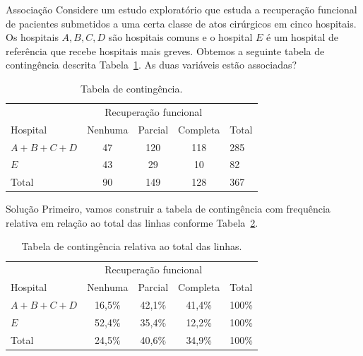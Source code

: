 \documentclass[9pt]{beamer}
\begin{document}
\begin{frame}{Associação}
Considere um estudo exploratório que estuda a recuperação funcional de pacientes submetidos a uma certa classe de atos cirúrgicos em cinco hospitais. Os hospitais $A, B, C, D$ são hospitais comuns e o hospital $E$ é um hospital de referência que recebe hospitais mais greves. Obtemos a seguinte tabela de contingência descrita Tabela~\ref{tab:independencia_conj}. As duas variáveis estão associadas?
\begin{table}[htbp]
	\centering
	\caption{Tabela de contingência.}
	\label{tab:independencia_conj}
	\begin{tabular}{l|ccc|l}
		\toprule[0.05cm]
		& \multicolumn{3}{|c|}{Recuperação funcional} & \\ \cmidrule[0.05cm]{2-4}
		Hospital & Nenhuma & Parcial & Completa & Total \\ \midrule[0.05cm]
		$A+B+C+D$ & 47 & 120 & 118 & 285\\
		$E$ & 43 & 29 & 10 & 82 \\ \midrule[0.05cm]
		Total & 90 & 149 & 128 & 367\\ \bottomrule[0.05cm]
	\end{tabular}
\end{table}
\end{frame}

\begin{frame}{Solução}
Primeiro, vamos construir a tabela de contingência com frequência relativa em relação ao total das linhas conforme Tabela~\ref{tab:independencia_row}.
\begin{table}[htbp]
	\centering
	\caption{Tabela de contingência relativa ao total das linhas.}
	\label{tab:independencia_row}
	\begin{tabular}{l|ccc|l}
		\toprule[0.05cm]
		& \multicolumn{3}{|c|}{Recuperação funcional} & \\ \cmidrule[0.05cm]{2-4}
		Hospital & Nenhuma & Parcial & Completa & Total \\ \midrule[0.05cm]
		$A+B+C+D$ & 16,5\% & 42,1\% & 41,4\% & 100\%\\
		$E$ & 52,4\% & 35,4\% & 12,2\% & 100\% \\ \midrule[0.05cm]
		Total & 24,5\% & 40,6\% & 34,9\% & 100\%\\ \bottomrule[0.05cm]
	\end{tabular}
\end{table} 
\end{frame}
\end{document}
